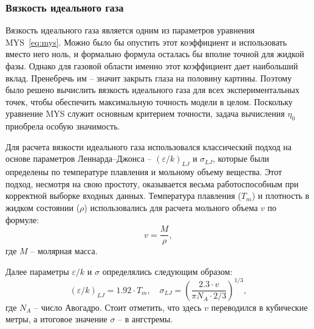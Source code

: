 \documentclass[a4paper,12pt]{article}
\begin{document}
    \subsubsection{Вязкость идеального газа}
      Вязкость идеального газа является одним из параметров уравнения MYS~\eqref{eq:mys}. Можно было бы опустить этот коэффициент и использовать вместо него ноль, и формально формула осталась бы вполне точной для жидкой фазы. Однако для газовой области именно этот коэффициент дает наибольший вклад. Пренебречь им -- значит закрыть глаза на половину картины. Поэтому было решено вычислить вязкость идеального газа для всех экспериментальных точек, чтобы обеспечить максимальную точность модели в целом. Поскольку уравнение MYS служит основным критерием точности, задача вычисления $\eta_0$ приобрела особую значимость.

      Для расчета вязкости идеального газа использовался классический подход на основе параметров Леннарда--Джонса -- $(\varepsilon/k)_{LJ}$ и $\sigma_{LJ}$, которые были определены по температуре плавления и мольному объему вещества. Этот подход, несмотря на свою простоту, оказывается весьма работоспособным при корректной выборке входных данных. Температура плавления ($T_m$) и плотность в жидком состоянии ($\rho$) использовались для расчета мольного объема $v$ по формуле:
      \[
      v = \frac{M}{\rho},
      \]
      где $M$ -- молярная масса.
      
      Далее параметры $\varepsilon/k$ и $\sigma$ определялись следующим образом:
      \[
        (\varepsilon/k)_{LJ} = 1.92 \cdot T_m, \quad 
        \sigma_{LJ} = \left( \frac{2.3 \cdot v}{\pi N_A \cdot 2/3} \right)^{1/3},
      \]
      где $N_A$ -- число Авогадро. Стоит отметить, что здесь $v$ переводился в кубические метры, а итоговое значение $\sigma$ -- в ангстремы.
     
\end{document}
